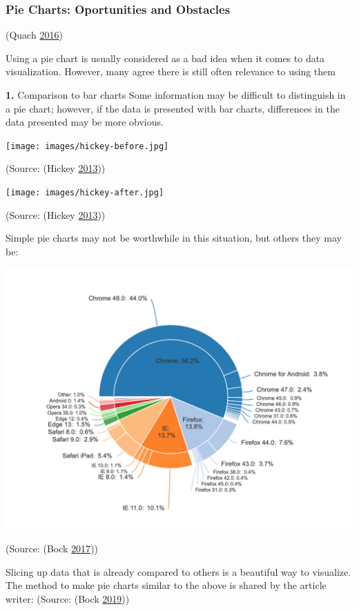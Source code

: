 \documentclass[]{book}
\begin{document}
\hypertarget{pie-charts-oportunities-and-obstacles}{%
\subsubsection{Pie Charts: Oportunities and Obstacles}\label{pie-charts-oportunities-and-obstacles}}

(Quach \protect\hyperlink{ref-quach-penny}{2016})

Using a pie chart is usually considered as a bad idea when it comes to data visualization. However, many agree there is still often relevance to using them

\textbf{1.} Comparison to bar charts
Some information may be difficult to distinguish in a pie chart; however, if the data is presented with bar charts, differences in the data presented may be more obvious.

\texttt{[image: images/hickey-before.jpg]}

(Source: (Hickey \protect\hyperlink{ref-hickey-pie-worst}{2013}))

\texttt{[image: images/hickey-after.jpg]}

(Source: (Hickey \protect\hyperlink{ref-hickey-pie-worst}{2013}))

Simple pie charts may not be worthwhile in this situation, but others they may be:

\includegraphics{images/Beautiful-Pie-Chart.png}

(Source: (Bock \protect\hyperlink{ref-Pro-Pie-charts}{2017}))

Slicing up data that is already compared to others is a beautiful way to visualize. The method to make pie charts similar to the above is shared by the article writer: (Source: (Bock \protect\hyperlink{ref-displayr-create-pie-charts}{2019}))
\end{document}
